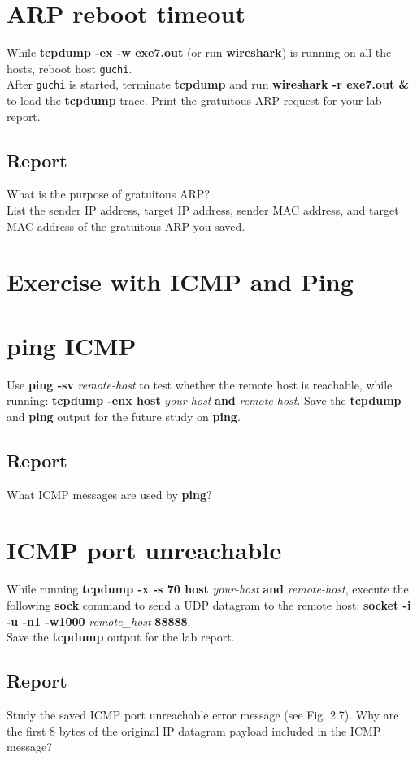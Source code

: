 \documentclass{../UTNetLab}
\begin{document}
\section{ARP reboot timeout}
    While \textbf{tcpdump -ex -w exe7.out} (or run \textbf{wireshark}) is running on all the hosts, reboot host \texttt{guchi}. \\
    After \texttt{guchi} is started, terminate \textbf{tcpdump} and run \textbf{wireshark -r exe7.out \&} to load the \textbf{tcpdump} trace.
    Print the gratuitous ARP request for your lab report.
    \subsection*{Report}
    What is the purpose of gratuitous ARP? \\
    List the sender IP address, target IP address, sender MAC address, and target MAC address of the gratuitous ARP you saved.


\section*{Exercise with ICMP and Ping}
\section{ping ICMP}
    Use \textbf{ping -sv} \textit{remote-host} to test whether the remote host is reachable, while running: \textbf{tcpdump -enx host} \textit{your-host} \textbf{and} \textit{remote-host}.
    Save the \textbf{tcpdump} and \textbf{ping} output for the future study on \textbf{ping}.
    \subsection*{Report}
    What ICMP messages are used by \textbf{ping}?

\section{ICMP port unreachable}
    While running \textbf{tcpdump -x -s 70 host} \textit{your-host} \textbf{and} \textit{remote-host}, execute the following \textbf{sock} command to send a UDP datagram to the remote host: \textbf{socket -i -u -n1 -w1000} \textit{remote\_host} \textbf{88888}. \\
    Save the \textbf{tcpdump} output for the lab report.
    \subsection*{Report}
    Study the saved ICMP port unreachable error message (see Fig. 2.7).
    Why are the first 8 bytes of the original IP datagram payload included in the ICMP message?
\end{document}
